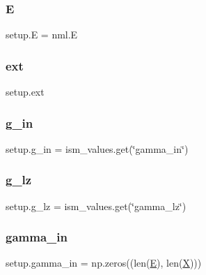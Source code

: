 \mbox{\label{namespacesetup_a8bf3113e27e2925ec3309507c6d5ebf2}} 
\subsubsection{\texorpdfstring{E}{E}}
{\footnotesize\ttfamily setup.\+E = nml.\+E}

\mbox{\label{namespacesetup_a8345a57adf0c9566a76dd0fa6dbba6df}} 
\subsubsection{\texorpdfstring{ext}{ext}}
{\footnotesize\ttfamily setup.\+ext}

\mbox{\label{namespacesetup_a3aa5fbbc8cef942f066f4861eb7a2c8a}} 
\subsubsection{\texorpdfstring{g\+\_\+in}{g\_in}}
{\footnotesize\ttfamily setup.\+g\+\_\+in = ism\+\_\+values.\+get(\char`\"{}gamma\+\_\+in\char`\"{})}

\mbox{\label{namespacesetup_ae7f4b7b24ea9e2fcf25907a43c6b0188}} 
\subsubsection{\texorpdfstring{g\+\_\+lz}{g\_lz}}
{\footnotesize\ttfamily setup.\+g\+\_\+lz = ism\+\_\+values.\+get(\char`\"{}gamma\+\_\+lz\char`\"{})}

\mbox{\label{namespacesetup_a00e0331730c3130543f9852040616ab1}} 
\subsubsection{\texorpdfstring{gamma\+\_\+in}{gamma\_in}}
{\footnotesize\ttfamily setup.\+gamma\+\_\+in = np.\+zeros((len(\hyperlink{namespacesetup_a8bf3113e27e2925ec3309507c6d5ebf2}{E}), len(\hyperlink{namespacesetup_a0d71901ea06bb31a1b5e9e742158486f}{X})))}

